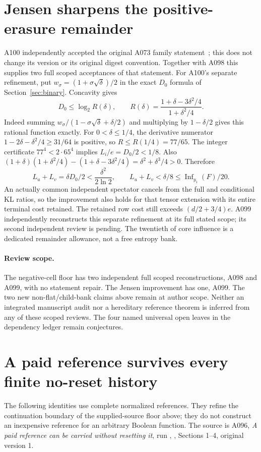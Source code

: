\documentclass[11pt]{article}
\begin{document}
\section{Jensen sharpens the positive-erasure remainder}
\label{sec:jensen}
A100 independently accepted the original A073 family statement~\cite{A100e}; this
does not change its version or its original digest convention. Together
with A098 this supplies two full scoped acceptances of that statement.
For A100's separate refinement, put $w_\sigma=(1+\sigma\sqrt\delta)/2$
in the exact $D_0$ formula of Section~\ref{sec:binary}. Concavity gives
\[
 D_0\le\log_2R(\delta),\qquad
 R(\delta)=\frac{1+\delta-3\delta^2/4}{1+\delta^2/4}.
\]
Indeed summing $w_\sigma/(1-\sigma\sqrt\delta+\delta/2)$ and
multiplying by $1-\delta/2$ gives this rational function exactly.
For $0<\delta\le1/4$, the derivative numerator
$1-2\delta-\delta^2/4\ge31/64$ is positive, so
$R\le R(1/4)=77/65$. The integer certificate $77^4<2\cdot65^4$
implies $L_i/e=D_0/2<1/8$. Also
$(1+\delta)(1+\delta^2/4)-(1+\delta-3\delta^2/4)
=\delta^2+\delta^3/4>0$. Therefore
\[
 L_u+L_v=\delta D_0/2<\frac{\delta^2}{2\ln2},\qquad
 L_u+L_v<\delta/8\le\operatorname{Inf}_{y_1}(F)/20.
\]
An actually common independent spectator cancels from the full and
conditional KL ratios, so the improvement also holds for that tensor
extension with its entire terminal cost retained. The retained row cost
still exceeds $(d/2+3/4)e$. A099 independently reconstructs this separate
refinement at its full stated scope; its second independent review is
pending. The twentieth of core influence is a dedicated remainder
allowance, not a free entropy bank.

\paragraph{Review scope.}
The negative-cell floor has two independent full scoped reconstructions,
A098 and A099, with no statement repair. The Jensen improvement has one,
A099. The two new non-flat/child-bank claims above remain at author scope.
Neither an integrated manuscript audit nor a hereditary reference theorem
is inferred from any of these scoped reviews. The four named universal
open leaves in the dependency ledger remain conjectures.


\section{A paid reference survives every finite no-reset history}
\label{sec:conservative}
The following identities use complete normalized references. They refine
the continuation boundary of the supplied-source floor above; they do not
construct an inexpensive reference for an arbitrary Boolean function.
The source is A096, \emph{A paid reference can be carried without resetting it},
run ,
, Sections 1--4, original version 1.
\end{document}
